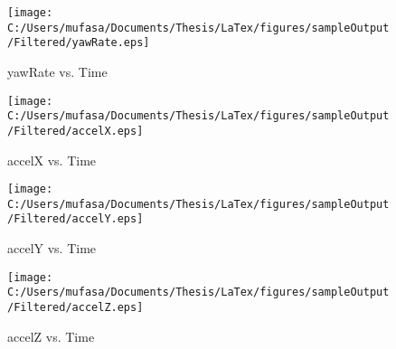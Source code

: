 \begin{figure}[]
	\centering
	\caption{yawRate vs. Time}
		\texttt{[image: C:/Users/mufasa/Documents/Thesis/LaTex/figures/sampleOutput/Filtered/yawRate.eps]}
\end{figure}
\begin{figure}[]
	\centering
	\caption{accelX vs. Time}
		\texttt{[image: C:/Users/mufasa/Documents/Thesis/LaTex/figures/sampleOutput/Filtered/accelX.eps]}
\end{figure}
\begin{figure}[]
	\centering
	\caption{accelY vs. Time}
		\texttt{[image: C:/Users/mufasa/Documents/Thesis/LaTex/figures/sampleOutput/Filtered/accelY.eps]}
\end{figure}
\begin{figure}[]
	\centering
	\caption{accelZ vs. Time}
		\texttt{[image: C:/Users/mufasa/Documents/Thesis/LaTex/figures/sampleOutput/Filtered/accelZ.eps]}
\end{figure}
